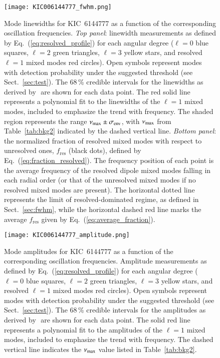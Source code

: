 \begin{figure}
   \centering
   \texttt{[image: KIC006144777\_fwhm.png]}
      \caption{Mode linewidths for KIC~6144777 as a function of the corresponding oscillation frequencies. \textit{Top panel}: linewidth measurements as defined by Eq.~(\ref{eq:resolved_profile}) for each angular degree ($\ell = 0$ blue squares, $\ell = 2$ green triangles, $\ell = 3$ yellow stars, and resolved $\ell = 1$ mixed modes red circles). Open symbols represent modes with detection probability under the suggested threshold (see Sect.~\ref{sec:test}). The 68\,\% credible intervals for the linewidths as derived by \diamonds\,\,are shown for each data point. The red solid line represents a polynomial fit to the linewidths of the $\ell = 1$ mixed modes, included to emphasize the trend with frequency. The shaded region represents the range $\nu_\mathrm{max} \pm \sigma_\mathrm{env}$, with $\nu_\mathrm{max}$ from Table~\ref{tab:bkg2} indicated by the dashed vertical line. \textit{Bottom panel}: the normalized fraction of resolved mixed modes with respect to unresolved ones, $f_\mathrm{res}$ (black dots), defined by Eq.~(\ref{eq:fraction_resolved}). The frequency position of each point is the average frequency of the resolved dipole mixed modes falling in each radial order (or that of the unresolved mixed modes if no resolved mixed modes are present). The horizontal dotted line represents the limit of resolved-dominated regime, as defined in Sect.~\ref{sec:fwhm}, while the horizontal dashed red line marks the average $f_\mathrm{res}$ given by Eq.~(\ref{eq:average_fraction}).}
    \label{fig:6144777fwhm}
\end{figure}

\begin{figure}
   \centering
   \texttt{[image: KIC006144777\_amplitude.png]}
      \caption{Mode amplitudes for KIC~6144777 as a function of the corresponding oscillation frequencies. Amplitude measurements as defined by Eq.~(\ref{eq:resolved_profile}) for each angular degree ($\ell = 0$ blue squares, $\ell = 2$ green triangles, $\ell = 3$ yellow stars, and resolved $\ell = 1$ mixed modes red circles). Open symbols represent modes with detection probability under the suggested threshold (see Sect.~\ref{sec:test}). The 68\,\% credible intervals for the amplitudes as derived by \diamonds\,\,are shown for each data point. The solid red line represents a polynomial fit to the amplitudes of the $\ell = 1$ mixed modes, included to emphasize the trend with frequency. The dashed vertical line indicates the $\nu_\mathrm{max}$ value listed in Table~\ref{tab:bkg2}.}
    \label{fig:6144777amplitude}
\end{figure}
\clearpage


